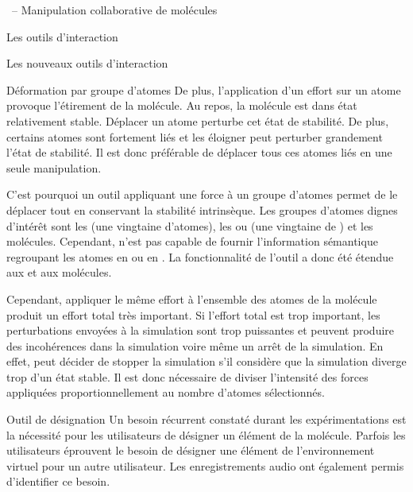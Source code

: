 \documentclass[myfrancais]{mythesis}
\begin{document}
\begin{mychapter}{\myShaddock\ -- Manipulation collaborative de molécules}
\begin{mysection}{Les outils d'interaction}
\begin{mysubsection}{Les nouveaux outils d'interaction}
\begin{mysubsubsection}{Déformation par groupe d'atomes}
					De plus, l'application d'un effort sur un atome provoque l'étirement de la molécule.
					Au repos, la molécule est dans état relativement stable.
					Déplacer un atome perturbe cet état de stabilité.
					De plus, certains atomes sont fortement liés et les éloigner peut perturber grandement l'état de stabilité.
					Il est donc préférable de déplacer tous ces atomes liés en une seule manipulation.

					C'est pourquoi un outil appliquant une force à un groupe d'atomes permet de le déplacer tout en conservant la stabilité intrinsèque.
					Les groupes d'atomes dignes d'intérêt sont les  (une vingtaine d'atomes), les \myhelice* ou \myfeuillet* (une vingtaine de ) et les molécules.
					Cependant,  n'est pas capable de fournir l'information sémantique regroupant les atomes en \myhelice* ou en \myfeuillet*.
					La fonctionnalité de l'outil  a donc été étendue aux  et aux molécules.

					Cependant, appliquer le même effort à l'ensemble des atomes de la molécule produit un effort total très important.
					Si l'effort total est trop important, les perturbations envoyées à la simulation sont trop puissantes et peuvent produire des incohérences dans la simulation voire même un arrêt de la simulation.
					En effet,  peut décider de stopper la simulation s'il considère que la simulation diverge trop d'un état stable.
					Il est donc nécessaire de diviser l'intensité des forces appliquées proportionnellement au nombre d'atomes sélectionnés.
				\end{mysubsubsection}
				\begin{mysubsubsection}{Outil de désignation}
					Un besoin récurrent constaté durant les expérimentations est la nécessité pour les utilisateurs de désigner un élément de la molécule.
					Parfois les utilisateurs éprouvent le besoin de désigner une élément de l'environnement virtuel pour un autre utilisateur.
					Les enregistrements audio ont également permis d'identifier ce besoin.


\end{mysubsubsection}
\end{mysubsection}
\end{mysection}
\end{mychapter}
\end{document}
